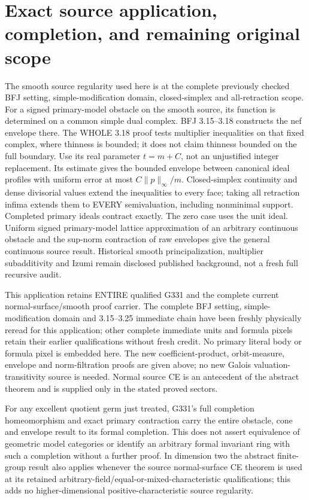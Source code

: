 \documentclass[11pt]{article}
\begin{document}
\section{Exact source application, completion, and remaining original scope}
The smooth source regularity used here is at the complete previously
checked BFJ setting, simple-modification domain, closed-simplex and
all-retraction scope. For a signed primary-model obstacle on the smooth
source, its function is determined on a common simple dual complex.
BFJ 3.15--3.18 constructs the nef envelope there. The WHOLE 3.18 proof
tests multiplier inequalities on that fixed complex, where thinness is
bounded; it does not claim thinness bounded on the full boundary.
Use its real parameter $t=m+C$, not an unjustified integer replacement.
Its estimate gives the bounded envelope between canonical ideal
profiles with uniform error at most $C\|p\|_\infty/m$.
Closed-simplex continuity and dense divisorial values extend the
inequalities to every face; taking all retraction infima extends them
to EVERY semivaluation, including nonminimal support. Completed primary
ideals contract exactly. The zero case uses the unit ideal. Uniform
signed primary-model lattice approximation of an arbitrary continuous
obstacle and the sup-norm contraction of raw envelopes give the general
continuous source result. Historical smooth principalization, multiplier
subadditivity and Izumi remain disclosed published background, not a
fresh full recursive audit.

This application retains ENTIRE qualified G331 and the complete current
normal-surface/smooth proof carrier. The complete BFJ setting,
simple-modification domain and 3.15--3.25 immediate chain have been freshly
physically reread for this application; other complete immediate units
and formula pixels retain their earlier qualifications without fresh
credit. No primary literal body or formula pixel is embedded here.
The new coefficient-product, orbit-measure, envelope and norm-filtration
proofs are given above; no new Galois valuation-transitivity source is
needed. Normal source CE is an antecedent of the abstract theorem and
is supplied only in the stated proved sectors.

For any excellent quotient germ just treated, G331's full completion
homeomorphism and exact primary contraction carry the entire obstacle,
cone and envelope result to its formal completion. This does not assert
equivalence of geometric model categories or identify an arbitrary
formal invariant ring with such a completion without a further proof.
In dimension two the abstract finite-group result also applies whenever
the source normal-surface CE theorem is used at its retained
arbitrary-field/equal-or-mixed-characteristic qualifications; this adds
no higher-dimensional positive-characteristic source regularity.
\end{document}
